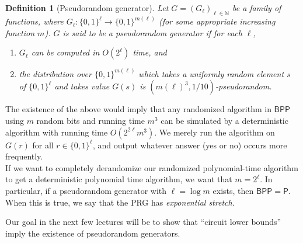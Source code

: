 \documentclass{article}
\newtheorem{definition}[theorem]{Definition}
\newcommand{\N}{\mathbb{N}}
\begin{document}
	\begin{definition}[Pseudorandom generator]
		Let $G = (G_\ell)_{\ell \in \N}$ be a family of functions, where $G_\ell : \{0,1\}^{\ell} \to \{0,1\}^{m(\ell)}$ (for some appropriate increasing function $m$). $G$ is said to be a \emph{pseudorandom generator} if for each $\ell$,
		\begin{enumerate}[label=(\alph*)]
			\item $G_\ell$ can be computed in $O(2^\ell)$ time, and
			\item the distribution over $\{0,1\}^{m(\ell)}$ which takes a uniformly random element $s$ of $\{0,1\}^\ell$ and takes value $G(s)$ is $(m(\ell)^3 , 1/10)$-pseudorandom.
		\end{enumerate}
	\end{definition}
	The existence of the above would imply that any randomized algorithm in $\mathsf{BPP}$ using $m$  random bits and running time $m^3$ can be simulated by a deterministic algorithm with running time $O(2^{2\ell}m^3)$. We merely run the algorithm on $G(r)$ for all $r \in \{0,1\}^\ell$, and output whatever answer (\textsf{yes} or \textsf{no}) occurs more frequently. \\
	If we want to completely derandomize our randomized polynomial-time algorithm to get a deterministic polynomial time algorithm, we want that $m = 2^\ell$. In particular, if a pseudorandom generator with $\ell = \log m$ exists, then $\mathsf{BPP} = \mathsf{P}$. When this is true, we say that the PRG has \emph{exponential stretch}. %

	Our goal in the next few lectures will be to show that ``circuit lower bounds'' imply the existence of pseudorandom generators.
\end{document}
